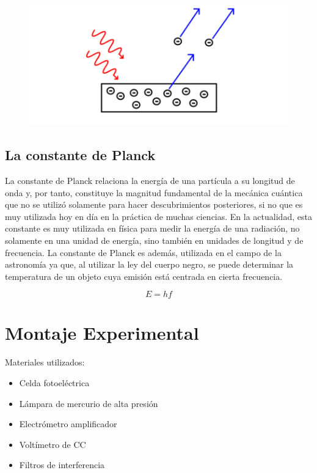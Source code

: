 \documentclass[letterpaper, 12pt]{article}
\begin{document}
\begin{figure}[H]
      \begin{center}
            \includegraphics[width=.5\linewidth]{Images/EfectoFotoelectrico.png}
            \caption{}
      \end{center}
\end{figure}

\subsection{La constante de Planck~\cite{Belmonte_2022}}

La constante de Planck relaciona la energía de una
partícula a su longitud de onda y, por tanto, constituye la
magnitud fundamental de la mecánica cuántica que no se
utilizó solamente para hacer descubrimientos posteriores,
si no que es muy utilizada hoy en día en la práctica de
muchas ciencias. En la actualidad, esta constante es muy
utilizada en física para medir la energía de una radiación,
no solamente en una unidad de energía, sino también en
unidades de longitud y de frecuencia. La constante de
Planck es además, utilizada en el campo de la astronomía ya
que, al utilizar la ley del cuerpo negro, se puede
determinar la temperatura de un objeto cuya emisión está
centrada en cierta frecuencia.

\begin{equation*}
      E = hf
\end{equation*}

\section{Montaje Experimental}

Materiales utilizados:

\begin{multicols}{2}
      \begin{itemize}[label=$\triangleright$]
            \item Celda fotoeléctrica
            \item Lámpara de mercurio de alta presión
            \item Electrómetro amplificador
            \item Voltímetro de CC
            \item Filtros de interferencia
      \end{itemize}
\end{multicols}
\end{document}
